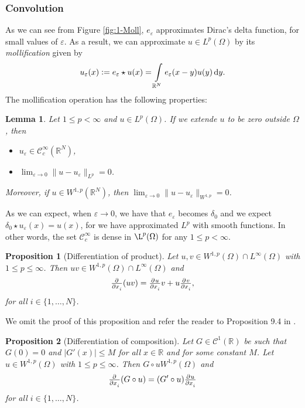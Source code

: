 \documentclass[a4paper,doc,11pt]{article}
\newtheorem{proposition}{Proposition}[theorem]
\newtheorem{lemma}[theorem]{Lemma}
\newcommand{\R}{\mathbb{R}}
\newcommand{\CC}{\mathcal{C}}
\begin{document}
\subsubsection{Convolution}

As we can see from Figure \ref{fig:1-Moll}, \( e_\varepsilon\) approximates Dirac's delta function, for small values of \(\varepsilon\). As a result, we can approximate \(u \in L^p (\Omega)\) by its \emph{mollification} given by
\[
    u_\varepsilon(x) := e_\varepsilon \star  u (x) = \int\limits_{\R^N} e_\varepsilon(x-y) u(y) \dif y.
\]
The mollification operation has the following properties:
\begin{lemma}
    Let \( 1\leq p < \infty\) and \( u \in L^p(\Omega)\). If we extende \(u \) to be zero outside \(\Omega\), then
    \begin{itemize}
        \item \(u_\varepsilon \in \CC_c^\infty (\R^N)\),
        \item \( \lim_{\varepsilon \to 0} \|u - u_\varepsilon\|_{L^p} = 0 \).
    \end{itemize}
    Moreover, if \(u \in W^{1,p} (\R^N)\), then \( \lim_{\varepsilon \to 0} \|u - u_\varepsilon\|_{W^{1,p}} = 0 \).
\end{lemma}

As we can expect, when \(\varepsilon \to 0\), we have that \( e_\varepsilon \) becomes \(\delta_0\) and we expect \( \delta_0 \star u_\varepsilon (x)  = u(x)\), for we have approximated \(L^p\) with smooth functions. In other words, the set \(\CC_c^\infty\) is dense in \(\L^p (\Omega)\) for any \( 1 \leq p < \infty\). 

\begin{proposition}[Differentiation of product]
    Let \(u,v \in W^{1,p} (\Omega) \cap L^\infty (\Omega)\) with \( 1\leq p \leq \infty\). Then \(uv \in W^{1,p} (\Omega) \cap L^{\infty} (\Omega)\) and
    \[
        \pd{ }{x_i} (uv) = \pd{u}{x_i} v + u \pd{v}{x_i},
    \]
    for all \( i \in \{1,\ldots, N\}\).
\end{proposition}

We omit the proof of this proposition and refer the reader to Proposition 9.4 in \citep{Brezis2010}.

\begin{proposition}[Differentiation of composition]
    Let \(G \in \CC^1(\R)\) be such that \( G(0) = 0\) and \( |G'(x)| \leq M  \) for all \( x\in \R\) and for some constant \(M\). Let \( u\in W^{1,p} (\Omega)\) with \( 1\leq p \leq \infty\). Then \(G \circ u W^{1,p}(\Omega)\) and
    \[
        \pd{ }{x_i} (G \circ u) = (G'\circ u) \pd{u}{x_i}
    \]
    for all \( i \in \{1,\ldots, N\}\).
\end{proposition}
\end{document}
